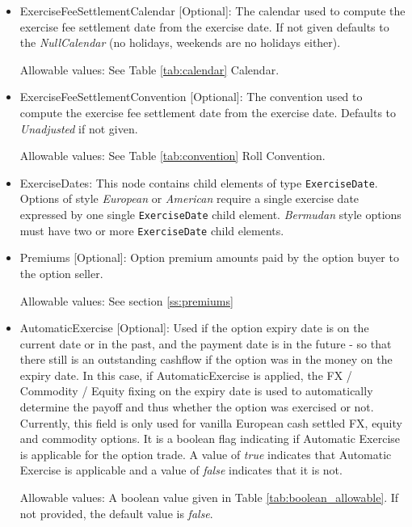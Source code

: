 \begin{itemize}
\item ExerciseFeeSettlementCalendar [Optional]: The calendar used to compute the exercise fee settlement date from the
  exercise date. If not given defaults to the  \emph{NullCalendar} (no holidays, weekends are no holidays either).
  
  Allowable values: See Table \ref{tab:calendar} Calendar.

\item ExerciseFeeSettlementConvention [Optional]: The convention used to compute the exercise fee settlement date from
  the exercise date. Defaults to \emph{Unadjusted} if not given.
  
  Allowable values: See Table \ref{tab:convention} Roll Convention.

\item ExerciseDates: This node contains child elements of type
  \lstinline!ExerciseDate!.  Options of style \emph{European} or
  \emph{American} require a single exercise date expressed by one
  single \lstinline!ExerciseDate! child element.  \emph{Bermudan}
  style options must have two or more \lstinline!ExerciseDate! child
  elements.

\item Premiums [Optional]: Option premium amounts paid by the option buyer to the option seller.

Allowable values:  See section \ref{ss:premiums}

\item AutomaticExercise [Optional]: Used if the option expiry date is on the current date or in the past, and the payment date is in the future  - so that there still is an outstanding cashflow if the option was in the money on the expiry date. In this case, if AutomaticExercise is applied, the FX / Commodity / Equity fixing on the expiry date is used to automatically determine the payoff and thus whether the option was exercised or not.\\
\medskip
Currently, this field is only used for vanilla European cash settled FX, equity and commodity options. It is a boolean flag indicating if Automatic Exercise is applicable for the option trade. A value of \emph{true} indicates that Automatic Exercise is applicable and a value of \emph{false} indicates that it is not.

Allowable values: A boolean value given in Table \ref{tab:boolean_allowable}. If not provided, the default value is \emph{false}.


\end{itemize}
